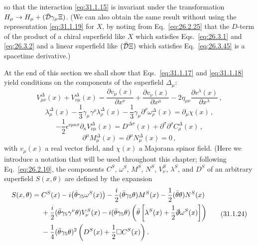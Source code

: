 so that the interaction \eqref{eq:31.1.15} is invariant under the
transformation
\(H_\mu\to H_\mu+(\bar{\SuperD}\gamma_\mu\Xi)\). (We can also obtain the same
result without using the representation \eqref{eq:31.1.19} for \(X\), by
noting from Eq.~\eqref{eq:26.2.25} that the \(D\)-term of the product of a
chiral superfield like \(X\) which satisfies Eqs.~\eqref{eq:26.3.1} and
\eqref{eq:26.3.2} and a linear superfield like
\((\bar{\SuperD}\Xi)\) which satisfies Eq.~\eqref{eq:26.3.45} is a spacetime
derivative.)

At the end of this section we shall show that Eqs.~\eqref{eq:31.1.17} and
\eqref{eq:31.1.18} yield conditions on the components of the superfield
\(\Delta_\mu\):
\begin{equation}
  V_{\mu\nu}^\Delta(x)+V_{\nu\mu}^\Delta(x)
  =\frac{\partial v_\mu(x)}{\partial x^\nu}
   +\frac{\partial v_\nu(x)}{\partial x^\mu}
   -2\eta_{\mu\nu}\frac{\partial v^\lambda(x)}{\partial x^\lambda}\,,
  \tag{31.1.20}\label{eq:31.1.20}
\end{equation}
\begin{equation}
  \lambda_\mu^\Delta(x)
  -\frac13\gamma_\mu\gamma^\rho\lambda_\rho^\Delta(x)
  -\frac13\gamma_\mu\partial^\rho\omega_\rho^\Delta(x)
  =\partial_\mu\chi(x)\,,
  \tag{31.1.21}\label{eq:31.1.21}
\end{equation}
\begin{equation}
  -\frac12\epsilon^{\nu\mu\kappa\sigma}
    \partial_\kappa V_{\nu\mu}^\Delta(x)
  =D^{\Delta\sigma}(x)+\partial^\sigma\partial^\rho C_\rho^\Delta(x)\,,
  \tag{31.1.22}\label{eq:31.1.22}
\end{equation}
\begin{equation}
  \partial^\mu M_\mu^\Delta(x)
  =\partial^\mu N_\mu^\Delta(x)=0\,,
  \tag{31.1.23}\label{eq:31.1.23}
\end{equation}
with \(v_\mu(x)\) a real vector field, and \(\chi(x)\) a Majorana spinor
field. (Here we introduce a notation that will be used throughout this
chapter; following Eq.~\eqref{eq:26.2.10}, the components \(C^S\),
\(\omega^S\), \(M^S\), \(N^S\), \(V_\nu^S\), \(\lambda^S\), and \(D^S\) of
an arbitrary superfield \(S(x,\theta)\) are defined by the expansion
\begin{equation}
  \begin{aligned}
  S(x,\theta)={}&C^S(x)-i\bigl(\bar\theta\gamma_5\omega^S(x)\bigr)
  -\frac{i}{2}(\bar\theta\gamma_5\theta)M^S(x)
  -\frac12(\bar\theta\theta)N^S(x)
  \\
  &+\frac{i}{2}(\bar\theta\gamma_5\gamma^\nu\theta)V_\nu^S(x)
  -i(\bar\theta\gamma_5\theta)
    \left(\bar\theta\left[
      \lambda^S(x)+\frac12\sl{\partial}\omega^S(x)
    \right]\right)
  \\
  &-\frac14(\bar\theta\gamma_5\theta)^2
    \left(D^S(x)+\frac12\Box C^S(x)\right).
  \end{aligned}
  \tag{31.1.24}\label{eq:31.1.24}
\end{equation}
